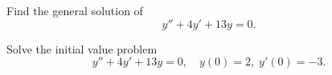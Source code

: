 
\vspace*{-20pt}
\noindent
\begin{example}
  \label{example:5.2.3}\rm \mbox{}
  \newline
  \begin{alist}
    \item %
    Find the general solution of
    \begin{equation}
      \label{eq:5.2.14}y''+4y'+13y=0.
    \end{equation}

    \item %
    Solve the initial value problem
    \begin{equation}
      \label{eq:5.2.15}y''+4y'+13y=0,\quad y(0)=2,\;y'(0)=-3.
    \end{equation}
  \end{alist}
\end{example}


